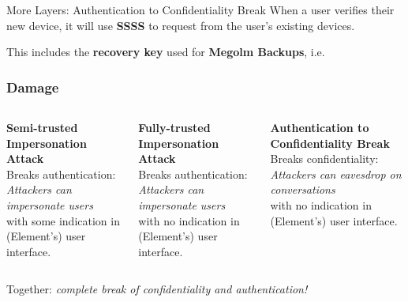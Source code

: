 \documentclass[aspectratio=169]{beamer}
\begin{document}
\begin{frame}{More Layers: Authentication to Confidentiality Break}
  When a user verifies their new device, it will use \textbf{SSSS} to request  from the user's existing devices.

  This includes the \textbf{recovery key} used for \textbf{Megolm Backups}, i.e.

  \centering\scalebox{0.75}{}

\end{frame}

\begin{frame}
  \frametitle{Damage}
  \begin{columns}
  \begin{column}{0.3\columnwidth}
    \textbf{Semi-trusted Impersonation Attack}\\
    \vspace{1em}
    Breaks authentication: \emph{Attackers can impersonate users} \\
    \vspace{1em}
    with some indication in (Element's) user interface.
  \end{column}
  \begin{column}{0.3\columnwidth}
    \textbf{Fully-trusted Impersonation Attack}\\
    \vspace{1em}
    Breaks authentication: \emph{Attackers can impersonate users} \\
    \vspace{1em}
    with \alert{no indication} in (Element's) user interface.
  \end{column}
  \begin{column}{0.3\columnwidth}
    \textbf{Authentication to Confidentiality Break}\\
    \vspace{1em}
    Breaks confidentiality: \emph{Attackers can eavesdrop on conversations} \\
    \vspace{1em}
    with \alert{no indication} in (Element's) user interface.
  \end{column}
  \end{columns}

  \vspace{2em}

  \centering
    {\large Together: \emph{complete break of confidentiality and authentication!}}

\end{frame}
\end{document}
